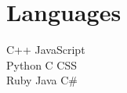 \documentclass[]{resume}
\begin{document}
\begin{minipage}[t]{0.33\textwidth}
\sectionsep


\section{Languages}


C++ \textbullet{} JavaScript \\
Python \textbullet{} C \textbullet{} CSS \\
Ruby \textbullet{} Java \textbullet{} C\# \\%


%
%

\end{minipage}
\hfill
\end{document}
